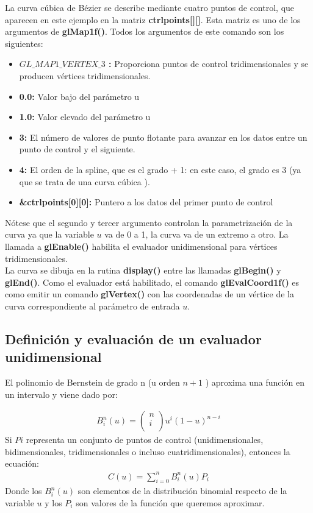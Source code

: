 La curva cúbica de Bézier se describe mediante cuatro puntos de control, que aparecen en este ejemplo en la matriz \textbf{ctrlpoints[][]}. Esta matriz es uno de los argumentos de \textbf{glMap1f()}. Todos los argumentos de este comando son los siguientes:\\
\begin{itemize}
    \item \textbf{$GL\_MAP1\_VERTEX\_3$ :} Proporciona puntos de control tridimensionales y se producen vértices tridimensionales.
    \item \textbf{0.0: } Valor bajo del parámetro u
    \item \textbf{1.0: } Valor elevado del parámetro u
    \item \textbf{3: } El número de valores de punto flotante para avanzar en los datos entre un punto de control y el siguiente.
    \item \textbf{4: } El orden de la spline, que es el grado + 1: en este caso, el grado es 3 (ya que se trata de una curva cúbica ).
    \item \textbf{\&ctrlpoints[0][0]: } Puntero a los datos del primer punto de control
\end{itemize}
Nótese que el segundo y tercer argumento controlan la parametrización de la curva ya que la variable $u$ va de 0 a 1, la curva va de un extremo a otro. La llamada a \textbf{glEnable()} habilita el evaluador unidimensional para vértices tridimensionales. \\

La curva se dibuja en la rutina \textbf{display()} entre las llamadas \textbf{glBegin()} y \textbf{glEnd()}. Como el evaluador está habilitado, el comando \textbf{glEvalCoord1f()} es como emitir un comando \textbf{glVertex()} con las coordenadas de un vértice de la curva correspondiente al parámetro de entrada $u$.

\subsection{Definición y evaluación de un evaluador unidimensional}
El polinomio de Bernstein de grado n (u orden $n+1$ ) aproxima una función en un intervalo y viene dado por:

\begin{align*}
B_i^n\left(u\right)=\left(\begin{matrix}n\\i\\\end{matrix}\right)u^i\left(1-u\right)^{n-i}
\end{align*}
Si $Pi$ representa un conjunto de puntos de control (unidimensionales, bidimensionales, tridimensionales o incluso cuatridimensionales), entonces la ecuación: 
\begin{align*}
C\left(u\right)=\sum_{i=0}^{n}{B_i^n\left(u\right)}P_i
\end{align*}
Donde los ${\displaystyle B_{i}^{n}(u)}$ son elementos de la distribución binomial respecto de la variable $u$ y los $P_{i}$ son valores de la función que queremos aproximar.\\

